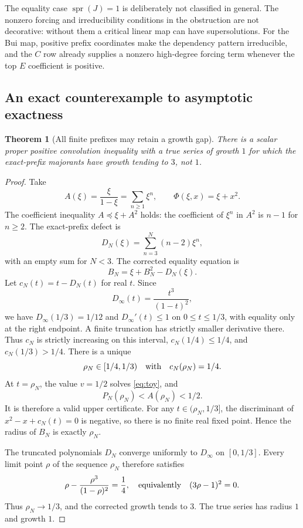 \documentclass[11pt,a4paper]{article}
\newtheorem{theorem}{Theorem}[section]
\theoremstyle{definition}
\theoremstyle{remark}
\newcommand{\spr}{\operatorname{spr}}
\begin{document}
The equality case $\spr(J)=1$ is deliberately not classified in general.
The nonzero forcing and irreducibility conditions in the obstruction are
not decorative: without them a critical linear map can have supersolutions.
For the Bui map, positive prefix coordinates make the dependency pattern
irreducible, and the $C$ row already supplies a nonzero high-degree forcing
term whenever the top $E$ coefficient is positive.

\subsection{An exact counterexample to asymptotic exactness}
\begin{theorem}[All finite prefixes may retain a growth gap]\label{thm:gap}
There is a scalar proper positive convolution inequality with a true series
of growth $1$ for which the exact-prefix majorants have growth tending to
$3$, not $1$.
\end{theorem}
\begin{proof}
Take
\[
 A(\xi)=\frac{\xi}{1-\xi}=\sum_{n\geq1}\xi^n,
 \qquad \Phi(\xi,x)=\xi+x^2.
\]
The coefficient inequality $A\preceq\xi+A^2$ holds: the coefficient of
$\xi^n$ in $A^2$ is $n-1$ for $n\geq2$.
The exact-prefix defect is
\[
 D_N(\xi)=\sum_{n=3}^N(n-2)\xi^n,
\]
with an empty sum for $N<3$. The corrected equality equation is
\begin{equation}\label{eq:toy}
 B_N=\xi+B_N^2-D_N(\xi).
\end{equation}
Let $c_N(t)=t-D_N(t)$ for real $t$.
Since
\[
 D_\infty(t)=\frac{t^3}{(1-t)^2},
\]
we have $D_\infty(1/3)=1/12$ and
$D_\infty'(t)\leq1$ on $0\leq t\leq1/3$, with equality only at the
right endpoint. A finite truncation has strictly smaller derivative there.
Thus $c_N$ is strictly increasing on this interval,
$c_N(1/4)\leq1/4$, and $c_N(1/3)>1/4$.
There is a unique
\[
 \rho_N\in[1/4,1/3)\quad\hbox{with}\quad c_N(\rho_N)=1/4.
\]
At $t=\rho_N$, the value $v=1/2$ solves \eqref{eq:toy}, and
\[
 P_N(\rho_N)<A(\rho_N)<1/2.
\]
It is therefore a valid upper certificate. For any
$t\in(\rho_N,1/3]$, the discriminant of
$x^2-x+c_N(t)=0$ is negative, so there is no finite real fixed point.
Hence the radius of $B_N$ is exactly $\rho_N$.

The truncated polynomials $D_N$ converge uniformly to $D_\infty$ on
$[0,1/3]$. Every limit point $\rho$ of the sequence $\rho_N$ therefore
satisfies
\[
 \rho-\frac{\rho^3}{(1-\rho)^2}=\frac14,
 \quad\hbox{equivalently}\quad (3\rho-1)^2=0.
\]
Thus $\rho_N\to1/3$, and the corrected growth tends to $3$.
The true series has radius $1$ and growth $1$.
\end{proof}
\end{document}
